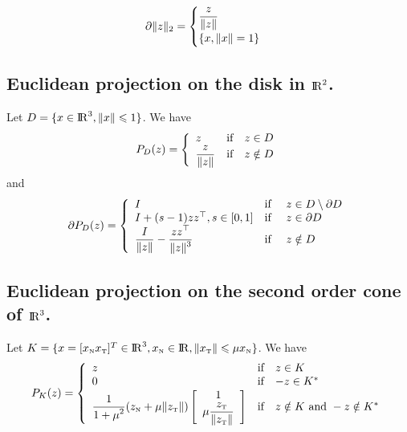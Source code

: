 \begin{equation}
  \label{eq:sub-norm}
  \partial \|z\|_2 =
  \begin{cases}
      \Frac z {\|z\|}\\
      \{x, \|x\|=1 \}
    \end{cases}
\end{equation}
\subsection*{Euclidean projection on the disk  in $\mathrm{I\!R}^2$.}
Let $D=\{x \in \mathrm{I\!R}^3, \|x\| \leqslant 1\}$. We have 
\begin{equation}
  \label{eq:projD}
  P_{D}(z) =\left\{
  \begin{array}{lcl}
    z &\text{if}& z \in D \\
    \Frac {z} {\|z\|}& \text{if}&z \notin D
    \end{array}\right. 
  \end{equation}
 and
\begin{equation}
  \label{eq:sub-projD}
  \partial P_{D}(z) =\left\{
  \begin{array}{lcl}
   I &\text{if }& z \in D \setminus \partial D \\
   I + (s-1)z z^\top , s\in [0,1]   &\text{if }& z \in  \partial D \\
   \Frac I {\|z\|} - \Frac{z z^\top}{\|z\|^3} &\text{if }& z \notin D  
   \end{array}\right. 
\end{equation}


\subsection*{Euclidean projection on the second order cone of $\mathrm{I\!R}^3$.}
Let $K=\{x = [x_{\hbox{\tiny{N}}} x_{\hbox{\tiny{T}}}]^T \in \mathrm{I\!R}^3, x_{\hbox{\tiny{N}}} \in \mathrm{I\!R}, \|x_{{\hbox{\tiny{T}}}}\| \leqslant \mu x_{{\hbox{\tiny{N}}}}\}$. We have 
\begin{equation}
  \label{eq:proj}
  P_{K}(z) =\left\{
  \begin{array}{lcl}
    z &\text{if}& z \in K \\
    0 &\text{if}& -z \in K^* \\
    \Frac 1 {1+\mu^2}(z_\n + \mu \|z_\t\| )
    \left[\begin{array}{c}
      1 \\
      \mu \Frac {z_\t} {\|z_\t\|}
      \end{array}\right]&\text{if}& z \notin K \text{ and } -z \notin K^*
    \end{array}\right. 
  \end{equation}

